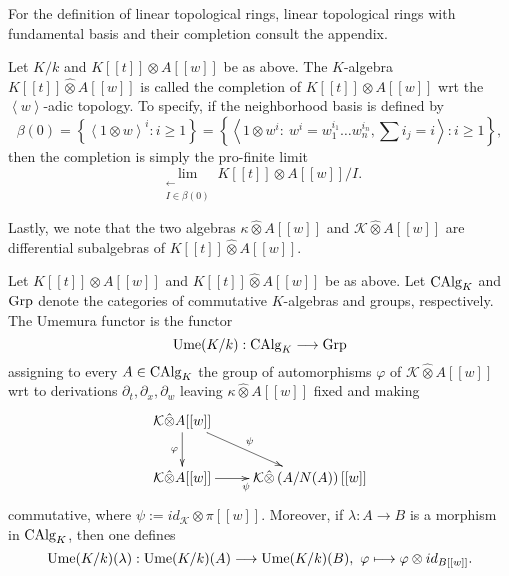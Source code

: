 For the definition of linear topological rings, linear topological rings with fundamental basis and their completion consult the appendix.
\begin{defi}
Let $K/k$ and $K[[t]] \otimes A[[w]]$ be as above. The $K$-algebra $K[[t]] \hat{\otimes} A[[w]]$ is called the completion of $K[[t]] \otimes A[[w]]$ wrt the $\left<w\right>$-adic topology. To specify, if the neighborhood basis is defined by
$$\beta(0) = \left\{\left<1\otimes w\right>^i : i \geq 1\right\} = \left\{\left<1 \otimes w^i : \ w^i = w_1^{i_1} \ldots w_n^{i_n}, \sum i_j = i\right> : i \geq 1\right\},$$
then the completion is simply the pro-finite limit
$$\lim_{\substack{\longleftarrow\\I \in \beta(0)}} K[[t]] \otimes A[[w]]/I.$$
\end{defi}
Lastly, we note that the two algebras $\kappa \hat{\otimes} A[[w]]$ and $\mathcal{K} \hat{\otimes} A[[w]]$ are differential subalgebras of $K[[t]] \hat{\otimes} A[[w]]$. 
\begin{defi}
Let $K[[t]] \otimes A[[w]]$ and $K[[t]] \hat{\otimes} A[[w]]$ be as above. Let $\mathrm{CAlg}_K$ and $\mathrm{Grp}$ denote the categories of commutative $K$-algebras and groups, respectively. The Umemura functor is the functor
$$\mathrm{Ume}(K/k) : \mathrm{CAlg}_K \longrightarrow \mathrm{Grp}$$
assigning to every $A \in \mathrm{CAlg}_K$ the group of automorphisms $\varphi$ of $\mathcal{K} \hat{\otimes} A[[w]]$ wrt to derivations $\partial_t, \partial_x, \partial_w$ leaving $\kappa \hat{\otimes} A[[w]]$ fixed and making
$$\xymatrix{
\mathcal{K} \hat{\otimes} A[[w]] \ar[d]_{\varphi}\ar[rd]^{\psi}&\\
\mathcal{K} \hat{\otimes} A[[w]] \ar[r]_{\psi}&\mathcal{K} \hat{\otimes} \left(A/N(A)\right)[[w]]\\
}$$
commutative, where $\psi := id_\mathcal{K} \otimes \pi[[w]]$. Moreover, if $\lambda : A \longrightarrow B$ is a morphism in $\mathrm{CAlg}_K$, then one defines
$$\mathrm{Ume}(K/k)(\lambda) : \mathrm{Ume}(K/k)(A) \longrightarrow \mathrm{Ume}(K/k)(B),\ \varphi \longmapsto \varphi \otimes id_{B[[w]]}.$$
\end{defi}
